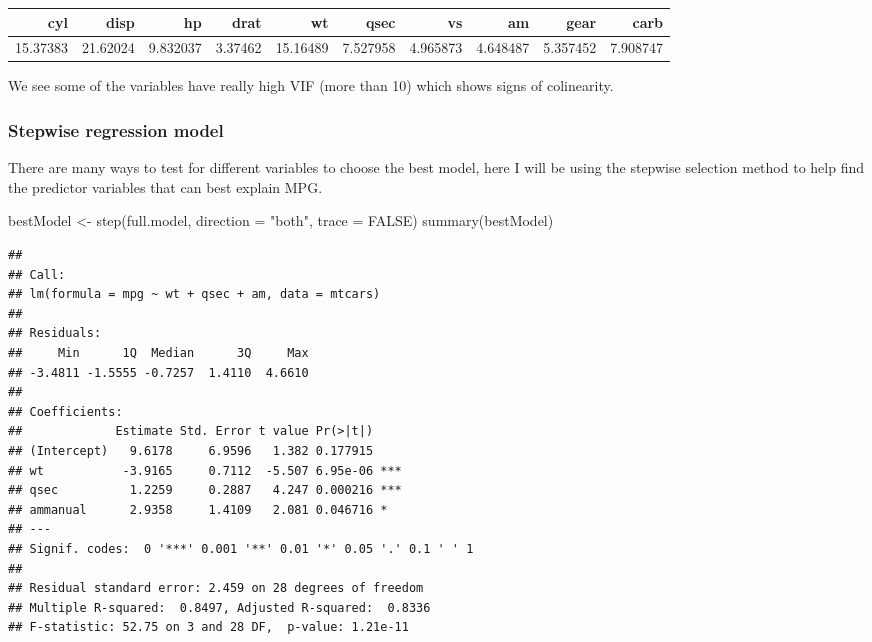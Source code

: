 \documentclass[
]{article}
\newenvironment{Shaded}{\begin{snugshade}}{\end{snugshade}}
\newcommand{\AttributeTok}[1]{\textcolor[rgb]{0.77,0.63,0.00}{#1}}
\newcommand{\ConstantTok}[1]{\textcolor[rgb]{0.00,0.00,0.00}{#1}}
\newcommand{\FunctionTok}[1]{\textcolor[rgb]{0.00,0.00,0.00}{#1}}
\newcommand{\NormalTok}[1]{#1}
\newcommand{\OtherTok}[1]{\textcolor[rgb]{0.56,0.35,0.01}{#1}}
\newcommand{\StringTok}[1]{\textcolor[rgb]{0.31,0.60,0.02}{#1}}
\begin{document}
\begin{table}
\centering
\begin{tabular}[t]{r|r|r|r|r|r|r|r|r|r}
\hline
cyl & disp & hp & drat & wt & qsec & vs & am & gear & carb\\
\hline
15.37383 & 21.62024 & 9.832037 & 3.37462 & 15.16489 & 7.527958 & 4.965873 & 4.648487 & 5.357452 & 7.908747\\
\hline
\end{tabular}
\end{table}

We see some of the variables have really high VIF (more than 10) which
shows signs of colinearity.

\hypertarget{stepwise-regression-model}{%
\subsubsection{Stepwise regression
model}\label{stepwise-regression-model}}

There are many ways to test for different variables to choose the best
model, here I will be using the stepwise selection method to help find
the predictor variables that can best explain MPG.

\begin{Shaded}
\begin{Highlighting}[]
\NormalTok{bestModel }\OtherTok{\textless{}{-}} \FunctionTok{step}\NormalTok{(full.model, }\AttributeTok{direction =} \StringTok{"both"}\NormalTok{,}
                  \AttributeTok{trace =} \ConstantTok{FALSE}\NormalTok{)}
\FunctionTok{summary}\NormalTok{(bestModel)}
\end{Highlighting}
\end{Shaded}

\begin{verbatim}
## 
## Call:
## lm(formula = mpg ~ wt + qsec + am, data = mtcars)
## 
## Residuals:
##     Min      1Q  Median      3Q     Max 
## -3.4811 -1.5555 -0.7257  1.4110  4.6610 
## 
## Coefficients:
##             Estimate Std. Error t value Pr(>|t|)    
## (Intercept)   9.6178     6.9596   1.382 0.177915    
## wt           -3.9165     0.7112  -5.507 6.95e-06 ***
## qsec          1.2259     0.2887   4.247 0.000216 ***
## ammanual      2.9358     1.4109   2.081 0.046716 *  
## ---
## Signif. codes:  0 '***' 0.001 '**' 0.01 '*' 0.05 '.' 0.1 ' ' 1
## 
## Residual standard error: 2.459 on 28 degrees of freedom
## Multiple R-squared:  0.8497, Adjusted R-squared:  0.8336 
## F-statistic: 52.75 on 3 and 28 DF,  p-value: 1.21e-11
\end{verbatim}
\end{document}

